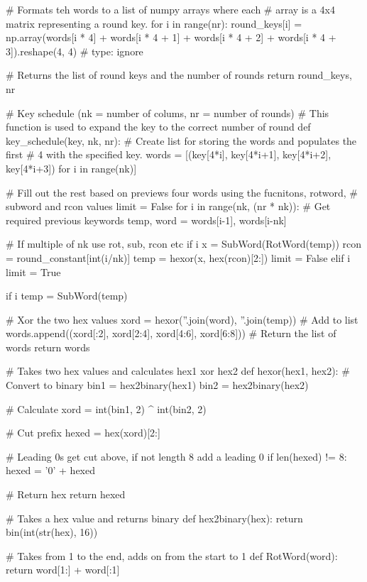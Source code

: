 \begin{python}
    # Formats teh words to a list of numpy arrays where each
    # array is a 4x4 matrix representing a round key.
    for i in range(nr):
        round_keys[i] = np.array(words[i * 4] + words[i * 4 + 1] + words[i * 4 + 2] + words[i * 4 + 3]).reshape(4, 4)  # type: ignore

    # Returns the list of round keys and the number of rounds
    return round_keys, nr


# Key schedule (nk = number of colums, nr = number of rounds)
# This function is used to expand the key to the correct number of round
def key_schedule(key, nk, nr):
    # Create list for storing the words and populates the first
    # 4 with the specified key.
    words = [(key[4*i], key[4*i+1], key[4*i+2], key[4*i+3]) for i in range(nk)]

    # Fill out the rest based on previews four words using the fucnitons, rotword,
    # subword and rcon values
    limit = False
    for i in range(nk, (nr * nk)):
        # Get required previous keywords
        temp, word = words[i-1], words[i-nk]

        # If multiple of nk use rot, sub, rcon etc
        if i %
            x = SubWord(RotWord(temp))
            rcon = round_constant[int(i/nk)]
            temp = hexor(x, hex(rcon)[2:])
            limit = False
        elif i %
            limit = True

        if i %
            temp = SubWord(temp)

        # Xor the two hex values
        xord = hexor(''.join(word), ''.join(temp))
        # Add to list
        words.append((xord[:2], xord[2:4], xord[4:6], xord[6:8]))
    # Return the list of words
    return words


# Takes two hex values and calculates hex1 xor hex2
def hexor(hex1, hex2):
    # Convert to binary
    bin1 = hex2binary(hex1)
    bin2 = hex2binary(hex2)

    # Calculate
    xord = int(bin1, 2) ^ int(bin2, 2)

    # Cut prefix
    hexed = hex(xord)[2:]

    # Leading 0s get cut above, if not length 8 add a leading 0
    if len(hexed) != 8:
        hexed = '0' + hexed

    # Return hex
    return hexed


# Takes a hex value and returns binary
def hex2binary(hex):
    return bin(int(str(hex), 16))


# Takes from 1 to the end, adds on from the start to 1
def RotWord(word):
    return word[1:] + word[:1]



\end{python}
